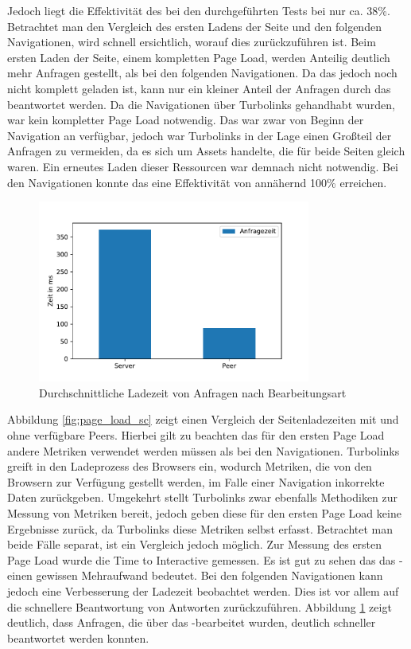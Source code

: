 Jedoch liegt die Effektivität des \cdn bei den durchgeführten Tests bei nur ca. 38\%. Betrachtet man den Vergleich des ersten Ladens der Seite und den folgenden Navigationen, wird schnell ersichtlich, worauf dies zurückzuführen ist. Beim ersten Laden der Seite, einem kompletten Page Load, werden Anteilig deutlich mehr Anfragen gestellt, als bei den folgenden Navigationen. Da das \cdn jedoch noch nicht komplett geladen ist, kann nur ein kleiner Anteil der Anfragen durch das \cdn beantwortet werden. Da die Navigationen über Turbolinks gehandhabt wurden, war kein kompletter Page Load notwendig. Das \cdn war zwar von Beginn der Navigation an verfügbar, jedoch war Turbolinks in der Lage einen Großteil der Anfragen zu vermeiden, da es sich um Assets handelte, die für beide Seiten gleich waren. Ein erneutes Laden dieser Ressourcen war demnach nicht notwendig. Bei den Navigationen konnte das \cdn eine Effektivität von annähernd 100\% erreichen. 

\begin{figure}[!h]
	\centering
	\includegraphics[width=0.8\textwidth]{figures/request_load}
	\caption[A Figure Short-Title]{Durchschnittliche Ladezeit von Anfragen nach Bearbeitungsart}
	\label{fig:request_load}
\end{figure}

Abbildung \ref{fig:page_load_sc} zeigt einen Vergleich der Seitenladezeiten mit und ohne verfügbare Peers. Hierbei gilt zu beachten das für den ersten Page Load andere Metriken verwendet werden müssen als bei den Navigationen. Turbolinks greift in den Ladeprozess des Browsers ein, wodurch Metriken, die von den Browsern zur Verfügung gestellt werden, im Falle einer Navigation inkorrekte Daten zurückgeben. Umgekehrt stellt Turbolinks zwar ebenfalls Methodiken zur Messung von Metriken bereit, jedoch geben diese für den ersten Page Load keine Ergebnisse zurück, da Turbolinks diese Metriken selbst erfasst. Betrachtet man beide Fälle separat, ist ein Vergleich jedoch möglich. Zur Messung des ersten Page Load wurde die Time to Interactive gemessen. Es ist gut zu sehen das das \pTp-\cdn einen gewissen Mehraufwand bedeutet. Bei den folgenden Navigationen kann jedoch eine Verbesserung der Ladezeit beobachtet werden. Dies ist vor allem auf die schnellere Beantwortung von Antworten zurückzuführen. Abbildung \ref{fig:request_load} zeigt deutlich, dass Anfragen, die über das \pTp-\cdn bearbeitet wurden, deutlich schneller beantwortet werden konnten.
 

